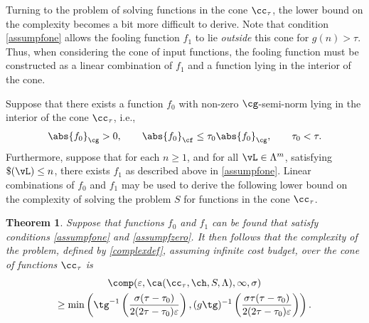 \documentclass[]{elsarticle}
\newtheorem{theorem}{Theorem}
\theoremstyle{definition}
\theoremstyle{remark}
\newcommand{\Fnorm}[1]{\abs{#1}_{\cf}}
\newcommand{\Gnorm}[1]{\abs{#1}_{\cg}}
\begin{document}
Turning to the problem of solving functions in the cone $\cc_{\tau}$, the lower bound on the complexity becomes a bit more difficult to derive.  Note that condition \eqref{assumpfone} allows the fooling function $f_1$ to lie \emph{outside} this cone for $g(n) > \tau$.  Thus, when considering the cone of input functions, the fooling function must be constructed as a linear combination of $f_1$ and a function lying in the interior of the cone.

Suppose that there exists a function $f_0$ with non-zero $\cg$-semi-norm lying in the interior of the cone $\cc_{\tau}$, i.e.,
\begin{equation}
\label{assumpfzero}
\Gnorm{f_{0}} > 0, \qquad \Fnorm{f_{0}} \le \tau_0 \Gnorm{f_{0}}, \qquad \tau_0 < \tau.
\end{equation}
Furthermore, suppose that for each $n \ge 1$, and for all $\vL \in \Lambda^m$, satisfying $\$(\vL)\le n$, there exists $f_1$ as described above in \eqref{assumpfone}. Linear combinations of $f_0$ and $f_1$ may be used to derive the following lower bound on the complexity of solving the problem $S$ for functions in the cone $\cc_{\tau}$.

\begin{theorem} \label{complowbd} Suppose that functions $f_{0}$ and $f_1$ can be found that satisfy conditions \eqref{assumpfone} and \eqref{assumpfzero}.  It then follows that the complexity of the problem, defined by \eqref{complexdef}, assuming infinite cost budget, over the cone of functions $\cc_{\tau}$ is
\begin{multline*}
\comp(\varepsilon,\ca(\cc_{\tau},\ch,S,\Lambda),\infty,\sigma) \\
\ge \min\left(\tg^{-1}\left(\frac{\sigma(\tau-\tau_0)}{2(2\tau-\tau_0)\varepsilon}\right), (g\tg)^{-1}\left(\frac{\sigma\tau(\tau-\tau_0)}{2(2\tau-\tau_0)\varepsilon}\right) \right).
\end{multline*}
\end{theorem}
\end{document}
